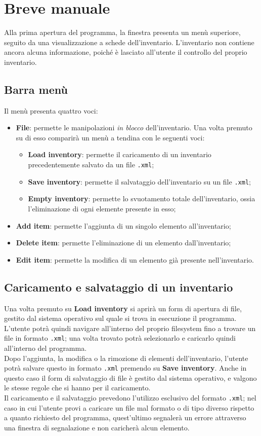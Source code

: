 \section{Breve manuale}
Alla prima apertura del programma, la finestra presenta un menù superiore, seguito da una visualizzazione a schede dell'inventario. L'inventario non contiene ancora alcuna informazione, poiché è lasciato all'utente il controllo del proprio inventario.

\subsection{Barra menù}
Il menù presenta quattro voci:
\begin{itemize}
  \item \textbf{File}: permette le manipolazioni \textit{in blocco} dell'inventario. Una volta premuto su di esso comparirà un menù a tendina con le seguenti voci:
  \begin{itemize}
    \item \textbf{Load inventory}: permette il caricamento di un inventario precedentemente salvato da un file \texttt{.xml};
    \item \textbf{Save inventory}: permette il salvataggio dell'inventario su un file \texttt{.xml};
    \item \textbf{Empty inventory}: permette lo svuotamento totale dell'inventario, ossia l'eliminazione di ogni elemente presente in esso;
  \end{itemize}
  \item \textbf{Add item}: permette l'aggiunta di un singolo elemento all'inventario;
  \item \textbf{Delete item}: permette l'eliminazione di un elemento dall'inventario;
  \item \textbf{Edit item}: permette la modifica di un elemento già presente nell'inventario.
\end{itemize}

\subsection{Caricamento e salvataggio di un inventario}
Una volta premuto su \textbf{Load inventory} si aprirà un form di apertura di file, gestito dal sistema operativo sul quale si trova in esecuzione il programma. L'utente potrà quindi navigare all'interno del proprio filesystem fino a trovare un file in formato \texttt{.xml}; una volta trovato potrà selezionarlo e caricarlo quindi all'interno del programma. \\
Dopo l'aggiunta, la modifica o la rimozione di elementi dell'inventario, l'utente potrà salvare questo in formato \texttt{.xml} premendo su \textbf{Save inventory}. Anche in questo caso il form di salvataggio di file è gestito dal sistema operativo, e valgono le stesse regole che si hanno per il caricamento. \\
Il caricamento e il salvataggio prevedono l'utilizzo esclusivo del formato \texttt{.xml}; nel caso in cui l'utente provi a caricare un file mal formato o di tipo diverso rispetto a quanto richiesto del programma, quest'ultimo segnalerà un errore attraverso una finestra di segnalazione e non caricherà alcun elemento.

